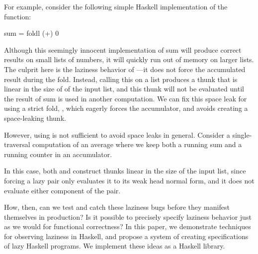 \documentclass[acmsmall,review]{acmart}\settopmatter{}
\begin{document}

For example, consider the following simple Haskell implementation of the  function:
\begin{inlinecode}
sum = foldl (+) 0
\end{inlinecode}
%
Although this seemingly innocent implementation of sum will produce correct
results on small lists of numbers, it will quickly run out of memory on larger
lists. The culprit here is the laziness behavior of ---it does not
force the accumulated result during the fold. Instead, calling this  on
a list produces a thunk that is linear in the size of of the input list, and
this thunk will not be evaluated until the result of sum is used in another
computation.
%
We can fix this space leak for  using a strict fold, , which
eagerly forces the accumulator, and avoids creating a space-leaking thunk.

However, using  is not sufficient to avoid space leaks in
general. Consider a single-traversal computation of an average where we keep
both a running sum and a running counter in an accumulator.
%
%
In this case, both  and  construct thunks linear in the
size of the input list, since forcing a lazy pair only evaluates it to its weak
head normal form, and it does not evaluate either component of the pair.

How, then, can we test and catch these laziness bugs before they
manifest themselves in production? Is it possible to precisely specify
laziness behavior just as we would for functional correctness?
%
In this paper, we demonstrate techniques for observing laziness in Haskell, and
propose a system of creating specifications of lazy Haskell programs. We
implement these ideas as a Haskell library.
\end{document}
